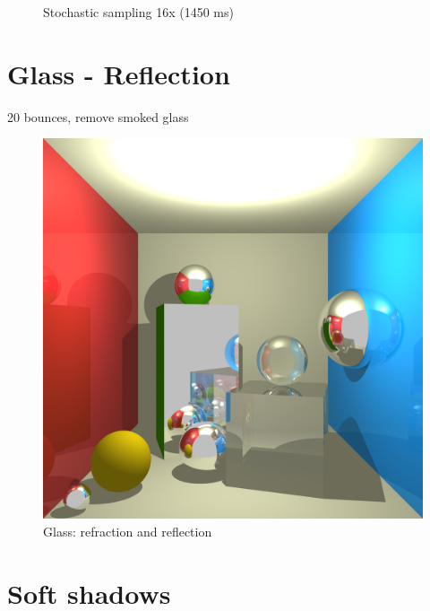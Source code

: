 \begin{figure}[H]
    \caption{Stochastic sampling 16x (1450 ms)}
\endminipage
\end{figure}


\section{Glass - Reflection}
20 bounces, remove smoked glass
\begin{figure}[H]
\centering
\includegraphics[width=0.35\linewidth]{img/glass_awesome.png}
\caption{Glass: refraction and reflection}
\end{figure}


\section{Soft shadows}
